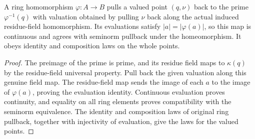 \begin{theorem}
\label{spectrum:valued-point-pullback}
\leanok
{}
A ring homomorphism $\varphi:A\to B$ pulls a valued point $(q,\nu)$
back to the prime $\varphi^{-1}(q)$ with valuation obtained by pulling
$\nu$ back along the actual induced residue-field homomorphism.
Its evaluations satisfy $|a|=|\varphi(a)|$, so this map is continuous
and agrees with seminorm pullback under the homeomorphism. It obeys
identity and composition laws on the whole points.
\end{theorem}
\begin{proof}
The preimage of the prime is prime, and its residue field maps to
$\kappa(q)$ by the residue-field universal property. Pull back the
given valuation along this genuine field map. The residue-field map
sends the image of each $a$ to the image of $\varphi(a)$, proving
the evaluation identity. Continuous evaluation proves continuity,
and equality on all ring elements proves compatibility with the
seminorm equivalence. The identity and composition laws of original
ring pullback, together with injectivity of evaluation, give the laws
for the valued points.
\end{proof}

